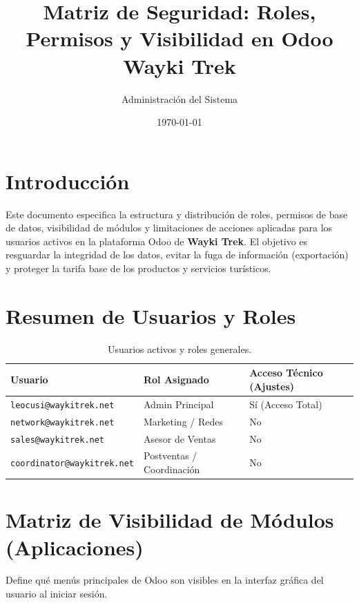 \documentclass[11pt,a4paper]{article}
\title{\textbf{Matriz de Seguridad: Roles, Permisos y Visibilidad en Odoo} \\ \large Wayki Trek}
\author{Administración del Sistema}
\date{\today}
\begin{document}
\maketitle

\section{Introducción}
Este documento especifica la estructura y distribución de roles, permisos de base de datos, visibilidad de módulos y limitaciones de acciones aplicadas para los usuarios activos en la plataforma Odoo de \textbf{Wayki Trek}. El objetivo es resguardar la integridad de los datos, evitar la fuga de información (exportación) y proteger la tarifa base de los productos y servicios turísticos.

\section{Resumen de Usuarios y Roles}

\begin{table}[h!]
\centering
\begin{tabular}{lll}
\toprule
\textbf{Usuario} & \textbf{Rol Asignado} & \textbf{Acceso Técnico (Ajustes)} \\
\midrule
\texttt{leocusi@waykitrek.net} & Admin Principal & Sí (Acceso Total) \\
\texttt{network@waykitrek.net} & Marketing / Redes & No \\
\texttt{sales@waykitrek.net} & Asesor de Ventas & No \\
\texttt{coordinator@waykitrek.net} & Postventas / Coordinación & No \\
\bottomrule
\end{tabular}
\caption{Usuarios activos y roles generales.}
\end{table}

\section{Matriz de Visibilidad de Módulos (Aplicaciones)}
Define qué menús principales de Odoo son visibles en la interfaz gráfica del usuario al iniciar sesión.
\end{document}

